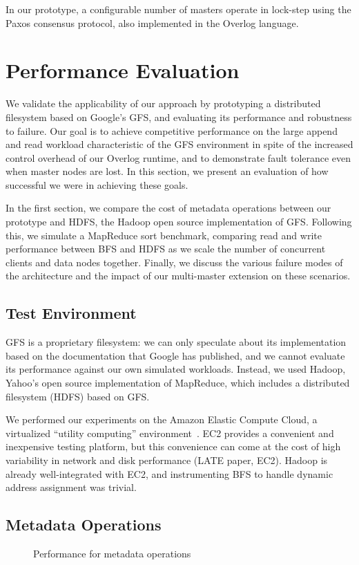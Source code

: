 \documentclass{article}
\begin{document}
In our prototype, a configurable number of masters operate in
lock-step using the Paxos consensus protocol, also implemented in the
Overlog language.

\section{Performance Evaluation}
\label{perf-eval}
We validate the applicability of our approach by prototyping a
distributed filesystem based on Google's GFS, and evaluating its
performance and robustness to failure.  Our goal is to achieve
competitive performance on the large append and read workload
characteristic of the GFS environment in spite of the increased
control overhead of our Overlog runtime, and to demonstrate fault
tolerance even when master nodes are lost.  In this section, we
present an evaluation of how successful we were in achieving these
goals.

In the first section, we compare the cost of metadata operations
between our prototype and HDFS, the Hadoop open source implementation
of GFS.  Following this, we simulate a MapReduce sort benchmark,
comparing read and write performance between BFS and HDFS as we scale
the number of concurrent clients and data nodes together.  Finally, we
discuss the various failure modes of the architecture and the impact
of our multi-master extension on these scenarios.

\subsection{Test Environment}
GFS is a proprietary filesystem: we can only speculate about its
implementation based on the documentation that Google has published,
and we cannot evaluate its performance against our own simulated
workloads.  Instead, we used Hadoop, Yahoo's open source
implementation of MapReduce, which includes a distributed filesystem
(HDFS) based on GFS.

We performed our experiments on the Amazon Elastic Compute Cloud, a
virtualized ``utility computing'' environment~\cite{amazon-ec2}.  EC2
provides a convenient and inexpensive testing platform, but this
convenience can come at the cost of high variability in network and
disk performance (LATE paper, EC2).  Hadoop is already well-integrated
with EC2, and instrumenting BFS to handle dynamic address assignment
was trivial.

\subsection{Metadata Operations}
\begin{figure}
\centering
{}
\caption{Performance for metadata operations}
\label{fig:metadata-perf}
\end{figure}
\end{document}
